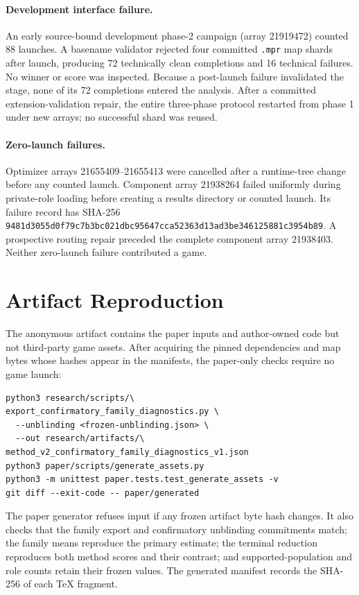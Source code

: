 \paragraph{Development interface failure.}
An early source-bound development phase-2 campaign (array 21919472) counted 88
launches. A basename validator rejected four committed \texttt{.mpr} map
shards after launch, producing 72 technically clean completions and 16
technical failures. No winner or score was inspected. Because a post-launch
failure invalidated the stage, none of its 72 completions entered the analysis.
After a committed extension-validation repair, the entire three-phase protocol
restarted from phase 1 under new arrays; no successful shard was reused.

\paragraph{Zero-launch failures.}
Optimizer arrays 21655409--21655413 were cancelled after a runtime-tree change
before any counted launch. Component array 21938264 failed uniformly during
private-role loading before creating a results directory or counted launch.
Its failure record has SHA-256
\nolinkurl{9481d3055d0f79c7b3bc021dbc95647cca52363d13ad3be346125881c3954b89}.
A prospective routing repair preceded the complete component array 21938403.
Neither zero-launch failure contributed a game.

\section{Artifact Reproduction}

The anonymous artifact contains the paper inputs and author-owned code but not
third-party game assets. After acquiring the pinned dependencies and map bytes
whose hashes appear in the manifests, the paper-only checks require no game
launch:

\begin{verbatim}
python3 research/scripts/\
export_confirmatory_family_diagnostics.py \
  --unblinding <frozen-unblinding.json> \
  --out research/artifacts/\
method_v2_confirmatory_family_diagnostics_v1.json
python3 paper/scripts/generate_assets.py
python3 -m unittest paper.tests.test_generate_assets -v
git diff --exit-code -- paper/generated
\end{verbatim}

The paper generator refuses input if any frozen artifact byte hash changes. It
also checks that the family export and confirmatory unblinding commitments
match; the family means reproduce the primary estimate; the terminal reduction
reproduces both method scores and their contrast; and supported-population and
role counts retain their frozen values. The generated manifest records the
SHA-256 of each TeX fragment.
